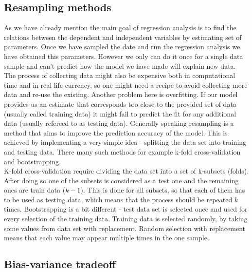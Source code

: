 \documentclass[10pt]{article}
\begin{document}
\subsection{Resampling methods}\label{resampling}
As we have already mention the main goal of regression analysis is to find the relations between the dependent and independent variables by estimating set of parameters. Once we have sampled the date and run the regression analysis we have obtained this parameters. However we only can do it once for a single data sample and can't predict how the model we have made will explain new data. The process of collecting data might also be expensive both in computational time and in real life currency, so one might need a recipe to avoid collecting more data and re-use the existing. Another problem here is overfitting. If our model provides us an estimate that corresponds too close to the provided set of data (usually called training data) it might fail to predict the fit for any additional data (usually refereed to as testing data). Generally speaking resampling is a method that aims to improve the prediction accuracy of the model. This is achieved by implementing a very simple idea - splitting the data set into training and testing data. There many such methods for example k-fold cross-validation and bootstrapping. \\
K-fold cross-validation require dividing the data set into a set of k-subsets (folds). After doing so one of the subsets is considered as a test one and the remaining ones are train data ($k-1$). This is done for all subsets, so that each of them has to be used as testing data, which means that the process should be repeated $k$ times. Bootstrapping is a bit different - test data set is selected once and used for every selection of the training data. Training data is selected randomly, by taking some values from data set with replacement. Random selection with replacement means that each value may appear multiple times in the one sample.
 
\subsection{Bias-variance tradeoff}
\end{document}
